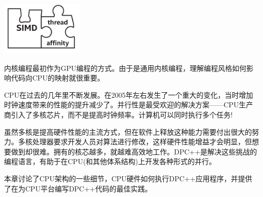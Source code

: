\begin{center}
	\includegraphics[width=0.3\textwidth]{content/chapter-16/images/1}
\end{center}

内核编程最初作为GPU编程的方式。由于是通用内核编程，理解编程风格如何影响代码向CPU的映射就很重要。\par

CPU在过去的几年里不断发展。在2005年左右发生了一个重大的变化，当时增加时钟速度带来的性能的提升减少了。并行性是最受欢迎的解决方案——CPU生产商引入了多核芯片，而不是提高时钟频率。计算机可以同时执行多个任务!\par

虽然多核是提高硬件性能的主流方式，但在软件上释放这种能力需要付出很大的努力。多核处理器要求开发人员对算法进行修改，这样硬件性能增益才会明显，但想要做到却很难。拥有的核芯越多，就越难高效地工作。DPC++是解决这些挑战的编程语言，有助于在CPU(和其他体系结构)上开发各种形式的并行。\par

本章讨论了CPU架构的一些细节，CPU硬件如何执行DPC++应用程序，并提供了在为CPU平台编写DPC++代码的最佳实践。\par






